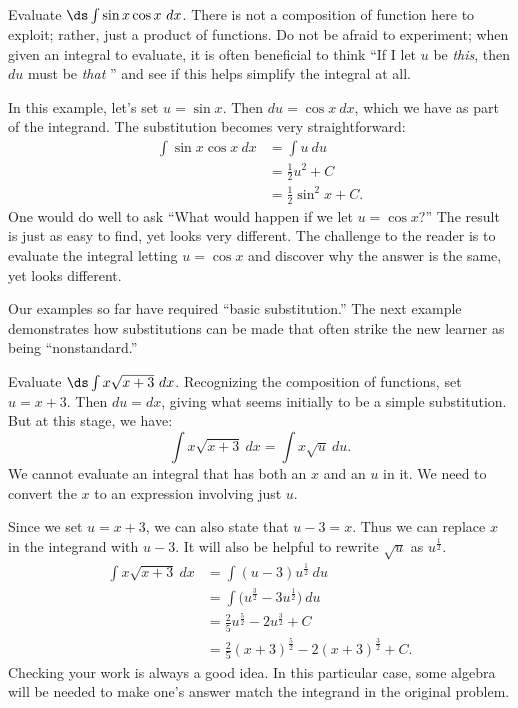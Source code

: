 \begin{example}\label{ex_sub10}
Evaluate $\ds \int \sin x\cos x\ dx$.
\solution
There is not a composition of function here to exploit; rather, just a product of functions. Do not be afraid to experiment; when given an integral to evaluate, it is often beneficial to think ``If I let $u$ be \emph{this}, then $du$ must be \emph{that} \dotso'' and see if this helps simplify the integral at all.

In this example, let's set $u = \sin x$. Then $du = \cos x\ dx$, which we have as part of the integrand. The substitution becomes very straightforward:
\begin{align*}
	\int \sin x\cos x\ dx
	&=	\int u\ du \\
	&= \frac12u^2+ C \\
	&= \frac12\sin^2 x + C.
\end{align*}
One would do well to ask ``What would happen if we let $u = \cos x$?'' The result is just as easy to find, yet looks very different. The challenge to the reader is to evaluate the integral letting $u = \cos x$ and discover why the answer is the same, yet looks different.
\end{example}

Our examples so far have required ``basic substitution.'' The next example demonstrates how substitutions can be made that often strike the new learner as being ``nonstandard.''

\begin{example}\label{ex_sub4}
Evaluate $\ds\int x\sqrt{x+3}\ dx$.
\solution
Recognizing the composition of functions, set $u = x+3$. Then $du = dx$, giving what seems initially to be a simple substitution. But at this stage, we have:
	\[\int x\sqrt{x+3}\ dx = \int x\sqrt{u}\ du.\]
We cannot evaluate an integral that has both an $x$ and an $u$ in it. We need to convert the $x$ to an expression involving just $u$.

Since we set $u = x+3$, we can also state that $u-3 = x$. Thus we can replace $x$ in the integrand with $u-3$. It will also be helpful to rewrite $\sqrt{u}$ as $u^\frac12$.
\begin{align*}
	\int x\sqrt{x+3} \ dx
	&= \int (u-3)u^\frac12\ du \\
	&= \int \bigl(u^\frac32 - 3u^\frac12\bigr) \ du \\
	&= \frac25u^\frac52 - 2u^\frac32 + C \\
	&= \frac25(x+3)^\frac52 - 2(x+3)^\frac32 + C.
\end{align*}
Checking your work is always a good idea. In this particular case, some algebra will be needed to make one's answer match the integrand in the original problem.
\end{example}

